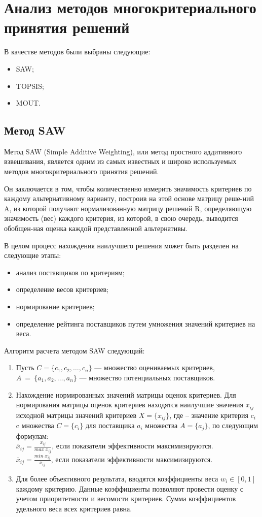 \section{Анализ методов многокритериального принятия решений}
В качестве методов были выбраны следующие:
\begin{itemize}
    \item SAW;
    \item TOPSIS;
    \item MOUT.
\end{itemize}
\subsection{Метод SAW}
Метод SAW (Simple Additive Weighting), или метод простного аддитивного
взвешивания, является одним из самых известных и широко используемых
методов многокритериального принятия решений.

Он заключается в том, чтобы количественно измерить значимость
критериев по каждому альтернативному варианту, построив на этой основе
матрицу реше-ний A, из которой получают нормализованную матрицу решений R,
определяющую значимость (вес) каждого критерия, из которой, в свою очередь,
выводится обобщен-ная оценка каждой представленной альтернативы.

В целом процесс нахождения наилучшего решения может быть разделен на
следующие этапы:
\begin{itemize}
    \item анализ поставщиков по критериям;
    \item определение весов критериев;
    \item нормирование критериев;
    \item определение рейтинга поставщиков путем умножения
    значений критериев на веса.
\end{itemize}

Алгоритм расчета методом SAW следующий:
\begin{enumerate}
    \item Пусть \(C = \{c_1, c_2, \ldots, c_n\}\) --- множество
    оцениваемых критериев, \(A~=~\{a_1, a_2, \ldots, a_n\}\) --- множество
    потенциальных поставщиков.
    \item Нахождение нормированных значений матрицы оценок критериев.
    Для нормирования матрицы оценок критериев находятся наилучшие
    значения \(x_{ij}\) исходной матрицы значений критериев
    \(X = \{x_{ij}\}\), где – значение критерия \(c_i\)
    c множества \(C=\{c_i\}\) для поставщика \(a_i\) множества
    \(A = \{a_j\}\), по следующим формулам:\\
    \(\bar x_{ij} = \frac{x_{ij}}{max\;x_{ij}}\),
    если показатели эффективности максимизируются.\\
    \(\bar x_{ij} = \frac{min\;x_{ij}}{x_{ij}}\),
    если показатели эффективности максимизируются.
    \item Для более объективного результата, вводятся коэффициенты веса
    \(w_i \in [0,1]\) каждому критерию. Данные коэффициенты позволяют
    провести оценку с учетом приоритетности и весомости критериев.
    Сумма коэффициентов удельного веса всех критериев равна.
\end{enumerate}

